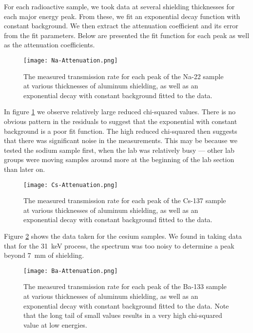 \documentclass[letter]{article}
\begin{document}
For each radioactive sample, we took data at several shielding thicknesses for each major energy peak. From these, we fit an exponential decay function with constant background. We then extract the attenuation coefficient and its error from the fit parameters. Below are presented the fit function for each peak as well as the attenuation coefficients.

\begin{figure}[h] \centering
    \texttt{[image: Na-Attenuation.png]}
    \caption{The measured transmission rate for each peak of the Na-22 sample at various thicknesses of aluminum shielding, as well as an exponential decay with constant background fitted to the data.}
    \label{fig:NaAtten}
\end{figure}

In figure \ref{fig:NaAtten} we observe relatively large reduced chi-squared values. There is no obvious pattern in the residuals to suggest that the exponential with constant background is a poor fit function. The high reduced chi-squared then suggests that there was significant noise in the measurements. This may be because we tested the sodium sample first, when the lab was relatively busy --- other lab groups were moving samples around more at the beginning of the lab section than later on.

\begin{figure}[h] \centering
    \texttt{[image: Cs-Attenuation.png]}
    \caption{The measured transmission rate for each peak of the Cs-137 sample at various thicknesses of aluminum shielding, as well as an exponential decay with constant background fitted to the data.}
    \label{fig:CsAtten}
\end{figure}

Figure \ref{fig:CsAtten} shows the data taken for the cesium samples. We found in taking data that for the \qty{31}{\kilo\electronvolt} process, the spectrum was too noisy to determine a peak beyond \qty{7}{\mm} of shielding.

\begin{figure}[h] \centering
    \texttt{[image: Ba-Attenuation.png]}
    \caption{The measured transmission rate for each peak of the Ba-133 sample at various thicknesses of aluminum shielding, as well as an exponential decay with constant background fitted to the data. Note that the long tail of small values results in a very high chi-squared value at low energies.}
    \label{fig:BaAtten}
\end{figure}
\end{document}
